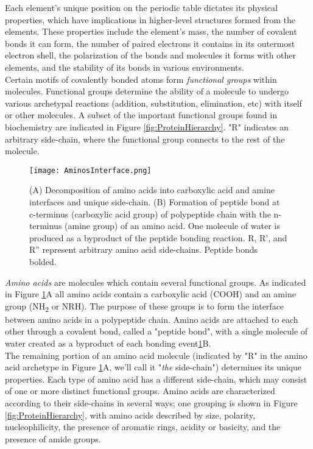 {Each element's unique position on the periodic table dictates its physical properties, which have implications in higher-level structures formed from the elements.  These properties include the element's mass, the number of covalent bonds it can form, the number of paired electrons it contains in its outermost electron shell, the polarization of the bonds and molecules it forms with other elements, and the stability of its bonds in various environments.\\

Certain motifs of covalently bonded atoms form \textit{functional groups} within molecules.  Functional groups determine the ability of a molecule to undergo various archetypal reactions (addition, substitution, elimination, etc) with itself or other molecules.  A subset of the important functional groups found in biochemistry are indicated in Figure \ref{fig:ProteinHierarchy}.  "R" indicates an arbitrary side-chain, where the functional group connects to the rest of the molecule.\\



\begin{figure}
  \texttt{[image: AminosInterface.png]}
  \caption{(A) Decomposition of amino acids into carboxylic acid and amine interfaces and unique side-chain. (B) Formation of peptide bond at c-terminus (carboxylic acid group) of polypeptide chain with the n-terminus (amine group) of an amino acid. One molecule of water is produced as a byproduct of the peptide bonding reaction.  R, R', and R'' represent arbitrary amino acid side-chains.  Peptide bonds bolded.}
  \label{fig:AminosInterface}
\end{figure}

\textit{Amino acids} are molecules which contain several functional groups.  As indicated in Figure \ref{fig:AminosInterface}A all amino acids contain a carboxylic acid (COOH) and an amine group (NH\textsubscript{2} or NRH).  The purpose of these groups is to form the interface between amino acids in a polypeptide chain.  Amino acids are attached to each other through a covalent bond, called a "peptide bond", with a single molecule of water created as a byproduct of each bonding event\ref{fig:AminosInterface}B.\\

The remaining portion of an amino acid molecule (indicated by "R" in the amino acid archetype in Figure \ref{fig:AminosInterface}A, we'll call it "\textit{the} side-chain") determines its unique properties.  Each type of amino acid has a different side-chain, which may consist of one or more distinct functional groups.  Amino acids are characterized according to their side-chains in several ways; one grouping is shown in Figure \ref{fig:ProteinHierarchy}, with amino acids described by size, polarity, nucleophilicity, the presence of aromatic rings, acidity or basicity, and the presence of amide groups.\\

}
